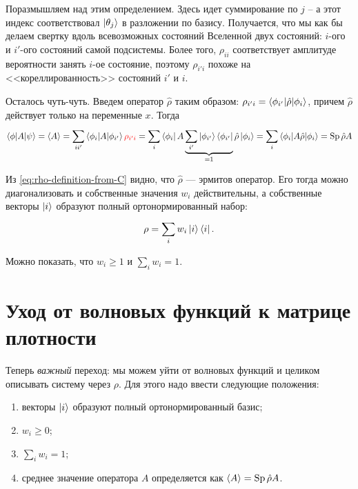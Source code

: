 \begin{lecture}
Поразмышляем над этим определением.
Здесь идет суммирование по $j$ -- а этот индекс соответствовал $\ket{\theta_j}$ в разложении по базису.
Получается, что мы как бы делаем свертку вдоль всевозможных состояний Вселенной двух состояний: $i$-ого и $i'$-ого состояний самой подсистемы.
Более того, $\rho_{ii}$ соответствует амплитуде вероятности занять $i$-ое состояние, поэтому $\rho_{i'i}$ похоже на <<кореллированность>> состояний $i'$ и $i$.

Осталось чуть-чуть.
Введем оператор $\hat{\rho}$ таким образом: $\rho_{i'i} = \braket{\phi_{i'}| \hat{\rho} | \phi_i}$, причем $\hat{\rho}$ действует только на переменные $x$.
Тогда
\begin{equation}
    \braket{\phi|A|\psi} = \braket{A} =
    \sum\limits_{ii'}^{} \braket{\phi_i|A|\phi_{i'} }    {\color{red} \rho_{i'i}} =
    \sum\limits_{i}^{} \bra{\phi_i} A 
    \underbrace{\sum\limits_{i'} \ket{\phi_{i'}} \bra{\phi_{i'}}}_{=1}
    \hat\rho \ket{\phi_i} =
    \sum\limits_{i}^{} \braket{\phi_i | A \hat{\rho} | \phi_i} = \text{Sp}\, \hat{\rho} A
\end{equation}

Из \eqref{eq:rho-definition-from-C} видно, что $\hat{\rho} $ --- эрмитов оператор.
Его тогда можно диагонализовать и собственные значения $w_i$ действительны, а собственные векторы $\ket{i}$ образуют полный ортонормированный набор:
\begin{equation}
    \label{eq:rho-in-own-basis}
    \rho = \sum\limits_{i}^{} w_i \ket{i} \bra{i}.
\end{equation}

Можно показать, что $w_i \geq 1$ и $\sum\limits_{i}^{} w_i = 1$.

\section{Уход от волновых функций к матрице плотности}

Теперь \textit{важный} переход: мы можем уйти от волновых функций и целиком описывать систему через $\rho$.
Для этого надо ввести следующие положения:
\begin{enumerate}
    \item векторы $\ket{i}$ образуют полный ортонормированный базис;
    \item $w_i \geq 0$;
    \item $\sum\limits_{i}^{} w_i = 1$;
    \item среднее значение оператора $A$ определяется как $\braket{A} = \text{Sp}\, \hat{\rho} A$.
\end{enumerate}


\end{lecture}
